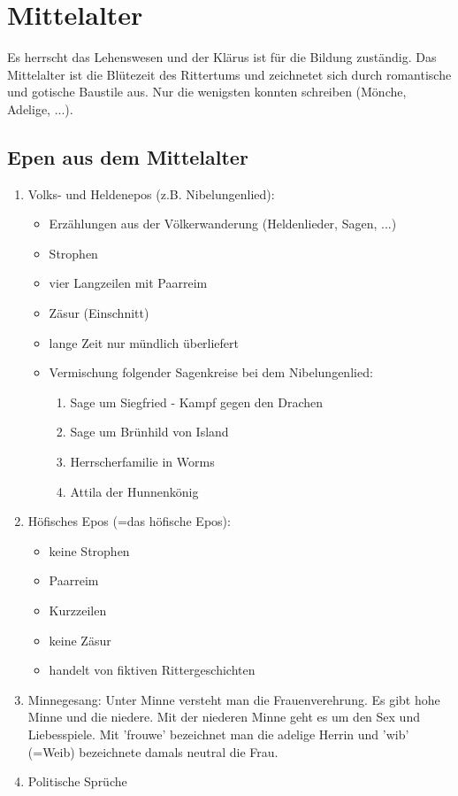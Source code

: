 \documentclass[12pt,a4paper]{article}
\begin{document}
\newpage	
	
\section{Mittelalter}	

Es herrscht das Lehenswesen und der Klärus ist für die Bildung zuständig.
Das Mittelalter ist die Blütezeit des Rittertums und zeichnetet sich durch romantische und gotische Baustile aus.
Nur die wenigsten konnten schreiben (Mönche, Adelige, ...).	

\subsection{Epen aus dem Mittelalter}

\begin{enumerate}
\item Volks- und Heldenepos (z.B. Nibelungenlied):
	\begin{itemize}
	\item Erzählungen aus der Völkerwanderung (Heldenlieder, Sagen, ...)
	\item Strophen
	\item vier Langzeilen mit Paarreim
	\item Zäsur (Einschnitt)
	\item lange Zeit nur mündlich überliefert
	\item Vermischung folgender Sagenkreise bei dem Nibelungenlied:
			\begin{enumerate}
			\item Sage um Siegfried - Kampf gegen den Drachen
			\item Sage um Brünhild von Island
			\item Herrscherfamilie in Worms
			\item Attila der Hunnenkönig
			\end{enumerate}
	\end{itemize}
	
\item Höfisches Epos (=das höfische Epos):
	\begin{itemize}
	\item keine Strophen
	\item Paarreim
	\item Kurzzeilen
	\item keine Zäsur
	\item handelt von fiktiven Rittergeschichten\\
	\end{itemize}						
	
\item Minnegesang: Unter Minne versteht man die Frauenverehrung. Es gibt hohe Minne und die niedere. Mit  der niederen Minne geht es um den Sex und Liebesspiele. Mit 'frouwe' bezeichnet man die adelige Herrin und 'wib' (=Weib) bezeichnete 	damals neutral die Frau.

\item Politische Sprüche	
\end{enumerate}	
\end{document}
